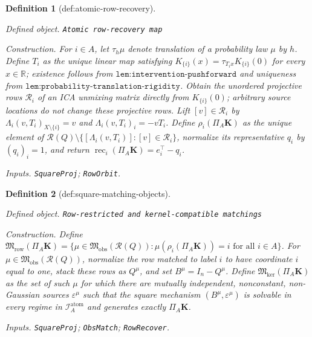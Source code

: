 \documentclass{article}
\newtheorem{definition}{Definition}
\begin{document}
\begin{definition}[def:atomic-row-recovery]\label{def:atomic-row-recovery}
\par\smallskip\noindent\emph{Defined object.} \texttt{Atomic row-\allowbreak{}recovery map}
\par\smallskip\noindent\emph{Construction.} For \(i\in A\), let \(\tau_h\mu\) denote translation of a probability law \(\mu\) by \(h\). Define \(T_i\) as the unique linear map satisfying \(K_{\{i\}}(x)=\tau_{T_i x}K_{\{i\}}(0)\) for every \(x\in\mathbb R\); existence follows from \(\texttt{lem:intervention-pushforward}\) and uniqueness from \(\texttt{lem:probability-translation-rigidity}\). Obtain the unordered projective rows \(\mathscr R_i\) of an ICA unmixing matrix directly from \(K_{\{i\}}(0)\); arbitrary source locations do not change these projective rows. Lift \([v]\in\mathscr R_i\) by \(\Lambda_i(v,T_i)_{X\setminus\{i\}}=v\) and \(\Lambda_i(v,T_i)_i=-vT_i\). Define \(\rho_i(\Pi_A\mathbf K)\) as the unique element of \(\mathscr R(Q)\setminus\{[\Lambda_i(v,T_i)]:[v]\in\mathscr R_i\}\), normalize its representative \(q_i\) by \((q_i)_i=1\), and return \(\operatorname{rec}_i(\Pi_A\mathbf K)=e_i^\top-q_i\).
\par\smallskip\noindent\emph{Inputs.} \texttt{SquareProj}; \texttt{RowOrbit}.
\end{definition}

\begin{definition}[def:square-matching-objects]\label{def:square-matching-objects}
\par\smallskip\noindent\emph{Defined object.} \texttt{Row-\allowbreak{}restricted and kernel-\allowbreak{}compatible matchings}
\par\smallskip\noindent\emph{Construction.} Define \(\mathfrak M_{\mathrm{row}}(\Pi_A\mathbf K)=\{\mu\in\mathfrak M_{\mathrm{obs}}(\mathscr R(Q)):\mu(\rho_i(\Pi_A\mathbf K))=i\text{ for all }i\in A\}\). For \(\mu\in\mathfrak M_{\mathrm{obs}}(\mathscr R(Q))\), normalize the row matched to label \(i\) to have coordinate \(i\) equal to one, stack these rows as \(Q^\mu\), and set \(B^\mu=I_n-Q^\mu\). Define \(\mathfrak M_{\mathrm{ker}}(\Pi_A\mathbf K)\) as the set of such \(\mu\) for which there are mutually independent, nonconstant, non-Gaussian sources \(\varepsilon^\mu\) such that the square mechanism \((B^\mu,\varepsilon^\mu)\) is solvable in every regime in \(\mathcal I_A^{\mathrm{atom}}\) and generates exactly \(\Pi_A\mathbf K\).
\par\smallskip\noindent\emph{Inputs.} \texttt{SquareProj}; \texttt{ObsMatch}; \texttt{RowRecover}.
\end{definition}
\end{document}

